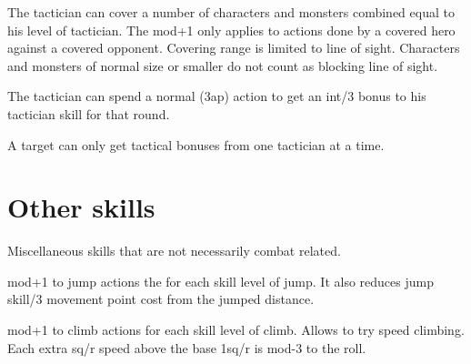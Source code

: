The tactician can cover a number of characters and monsters combined equal to his level of tactician. The mod+1 only applies to actions done by a covered hero against a covered opponent. Covering range is limited to line of sight. Characters and monsters of normal size or smaller do not count as blocking line of sight.

The tactician can spend a normal (3ap) action to get an int/3 bonus to his tactician skill for that round.

A target can only get tactical bonuses from one tactician at a time.




\closeskillslist
















\section*{Other skills}

Miscellaneous skills that are not necessarily combat related.



\openskillslist



 mod+1 to jump actions the for each skill level of jump. It also reduces jump skill/3 movement point cost from the jumped distance.


 mod+1 to climb actions for each skill level of climb. Allows to try speed climbing. Each extra sq/r speed above the base 1sq/r is mod-3 to the roll.


